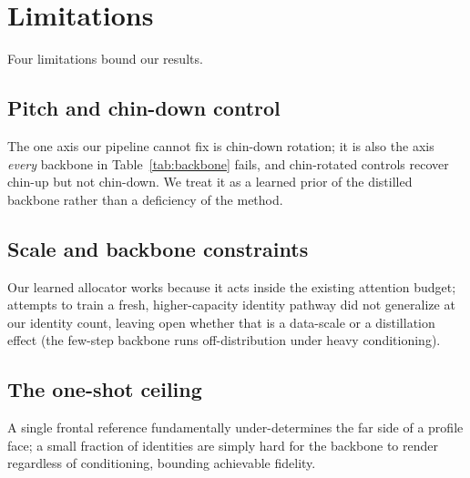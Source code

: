 \chapter{Limitations}
\label{sec:limitations}
Four limitations bound our results.

\section{Pitch and chin-down control}
\label{sec:lim-pitch}
The one axis our pipeline cannot fix is chin-down rotation; it is also the axis
\emph{every} backbone in Table~\ref{tab:backbone} fails, and chin-rotated
controls recover chin-up but not chin-down. We treat it as a learned prior of
the distilled backbone rather than a deficiency of the method.

\section{Scale and backbone constraints}
\label{sec:lim-scale}
Our learned allocator works because it acts
inside the existing attention budget; attempts to train a fresh, higher-capacity
identity pathway did not generalize at our identity count, leaving open whether
that is a data-scale or a distillation effect (the few-step backbone runs
off-distribution under heavy conditioning). 

\section{The one-shot ceiling}
\label{sec:lim-oneshot}
A single frontal reference fundamentally under-determines the far side of a profile
face; a small fraction of identities are simply hard for the backbone to render
regardless of conditioning, bounding achievable fidelity.

